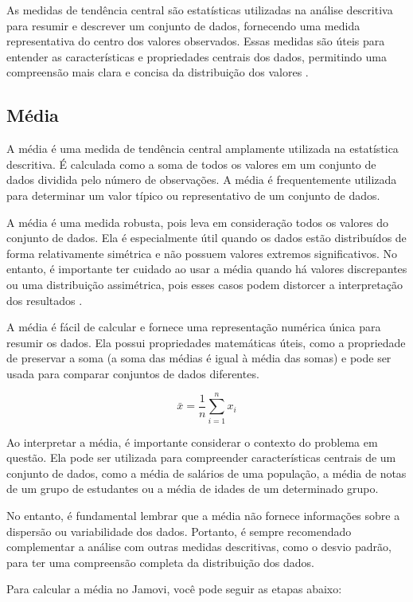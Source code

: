 As medidas de tendência central são estatísticas utilizadas na análise descritiva para resumir e descrever um conjunto de dados, fornecendo uma medida representativa do centro dos valores observados. Essas medidas são úteis para entender as características e propriedades centrais dos dados, permitindo uma compreensão mais clara e concisa da distribuição dos valores \parencite{Triola2017}.

\subsection{Média}

A média é uma medida de tendência central amplamente utilizada na estatística descritiva. É calculada como a soma de todos os valores em um conjunto de dados dividida pelo número de observações. A média é frequentemente utilizada para determinar um valor típico ou representativo de um conjunto de dados.

A média é uma medida robusta, pois leva em consideração todos os valores do conjunto de dados. Ela é especialmente útil quando os dados estão distribuídos de forma relativamente simétrica e não possuem valores extremos significativos. No entanto, é importante ter cuidado ao usar a média quando há valores discrepantes ou uma distribuição assimétrica, pois esses casos podem distorcer a interpretação dos resultados \parencite{Triola2017}.

A média é fácil de calcular e fornece uma representação numérica única para resumir os dados. Ela possui propriedades matemáticas úteis, como a propriedade de preservar a soma (a soma das médias é igual à média das somas) e pode ser usada para comparar conjuntos de dados diferentes.

\[
\bar{x} = \frac{1}{n} \sum_{i=1}^{n} x_i
\]

Ao interpretar a média, é importante considerar o contexto do problema em questão. Ela pode ser utilizada para compreender características centrais de um conjunto de dados, como a média de salários de uma população, a média de notas de um grupo de estudantes ou a média de idades de um determinado grupo.

No entanto, é fundamental lembrar que a média não fornece informações sobre a dispersão ou variabilidade dos dados. Portanto, é sempre recomendado complementar a análise com outras medidas descritivas, como o desvio padrão, para ter uma compreensão completa da distribuição dos dados.

Para calcular a média no Jamovi, você pode seguir as etapas abaixo:

